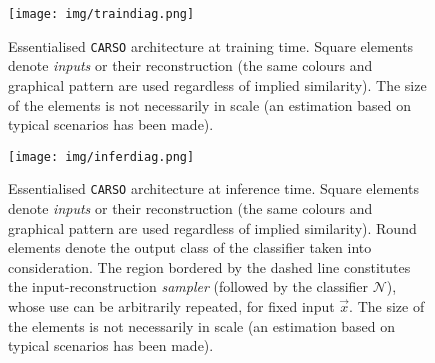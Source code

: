 \label{sec:appendix}
\vfill
\begin{figure}[H]
    \centering\texttt{[image: img/traindiag.png]}
    \caption{Essentialised \texttt{CARSO} architecture at training time. Square elements denote \textit{inputs} or their reconstruction (the same colours and graphical pattern are used regardless of implied similarity). The size of the elements is not necessarily in scale (an estimation based on typical scenarios has been made).}
\end{figure}
\vfill
\newpage

\null\vfill
\begin{figure}[H]
    \centering\texttt{[image: img/inferdiag.png]}
    \caption{Essentialised \texttt{CARSO} architecture at inference time. Square elements denote \textit{inputs} or their reconstruction (the same colours and graphical pattern are used regardless of implied similarity). Round elements denote the output class of the classifier taken into consideration. The region bordered by the dashed line constitutes the input-reconstruction \textit{sampler} (followed by the classifier $\mathcal{N}$), whose use can be arbitrarily repeated, for fixed input $\vec{x}$. The size of the elements is not necessarily in scale (an estimation based on typical scenarios has been made).}
\end{figure}
\vfill